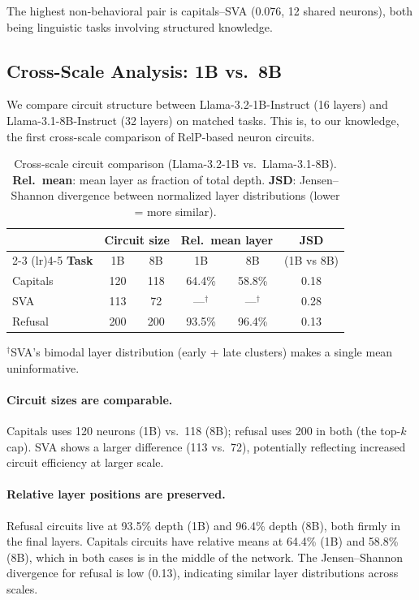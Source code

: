 \documentclass[11pt]{article}
\begin{document}
The highest non-behavioral pair is capitals--SVA (0.076, 12 shared neurons), both being linguistic tasks involving structured knowledge.


\subsection{Cross-Scale Analysis: 1B vs.\ 8B}
\label{sec:cross_scale}

We compare circuit structure between Llama-3.2-1B-Instruct (16 layers) and Llama-3.1-8B-Instruct (32 layers) on matched tasks.
This is, to our knowledge, the first cross-scale comparison of RelP-based neuron circuits.

\begin{table}[h]
\centering
\caption{Cross-scale circuit comparison (Llama-3.2-1B vs.\ Llama-3.1-8B). \textbf{Rel.\ mean}: mean layer as fraction of total depth. \textbf{JSD}: Jensen--Shannon divergence between normalized layer distributions (lower = more similar).}
\label{tab:cross_scale}
\small
\begin{tabular}{lccccc}
\toprule
& \multicolumn{2}{c}{\textbf{Circuit size}} & \multicolumn{2}{c}{\textbf{Rel.\ mean layer}} & \textbf{JSD} \\
\cmidrule(lr){2-3} \cmidrule(lr){4-5}
\textbf{Task} & 1B & 8B & 1B & 8B & (1B vs 8B) \\
\midrule
Capitals & 120 & 118 & 64.4\% & 58.8\% & 0.18 \\
SVA      & 113 &  72 & ---$^\dagger$    & ---$^\dagger$    & 0.28 \\
Refusal  & 200 & 200 & 93.5\% & 96.4\% & 0.13 \\
\bottomrule
\end{tabular}
\vspace{2pt}

{\footnotesize $^\dagger$SVA's bimodal layer distribution (early + late clusters) makes a single mean uninformative.}
\end{table}

\paragraph{Circuit sizes are comparable.}
Capitals uses 120 neurons (1B) vs.\ 118 (8B); refusal uses 200 in both (the top-$k$ cap).
SVA shows a larger difference (113 vs.\ 72), potentially reflecting increased circuit efficiency at larger scale.

\paragraph{Relative layer positions are preserved.}
Refusal circuits live at 93.5\% depth (1B) and 96.4\% depth (8B), both firmly in the final layers.
Capitals circuits have relative means at 64.4\% (1B) and 58.8\% (8B), which in both cases is in the middle of the network.
The Jensen--Shannon divergence for refusal is low (0.13), indicating similar layer distributions across scales.
\end{document}
